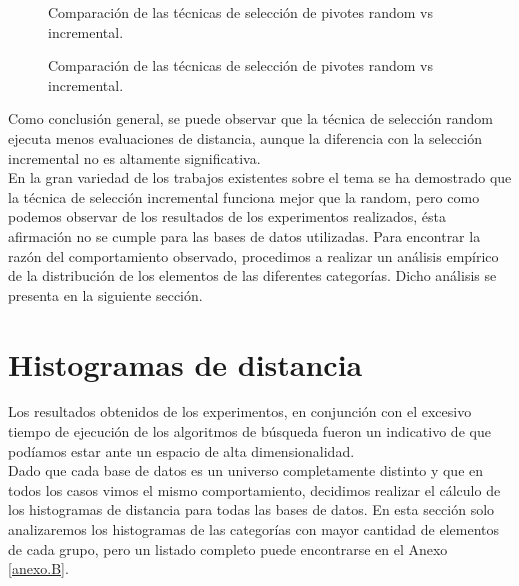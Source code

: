 \begin{figure}[tb]
\centering
{}
\caption{\small Comparaci\'on de las t\'ecnicas de selecci\'on de pivotes random vs incremental.}
\label{fig:ETS-1}
\end{figure}
\begin{figure}[tb]
\centering
{}
\caption{\small Comparaci\'on de las t\'ecnicas de selecci\'on de pivotes random vs incremental.}
\label{fig:ETS-2}

\end{figure}

Como conclusi\'on general, se puede observar que la t\'ecnica de selecci\'on random ejecuta menos evaluaciones de distancia, aunque la diferencia con la selecci\'on incremental no es altamente significativa.\\

En la gran variedad de los trabajos existentes sobre el tema se ha demostrado que la t\'ecnica de selecci\'on incremental funciona mejor que la random, pero como podemos observar de los resultados de los experimentos realizados, \'esta afirmaci\'on no se cumple para las bases de datos utilizadas. Para encontrar la raz\'on del comportamiento observado, procedimos a realizar un an\'alisis emp\'irico de la distribuci\'on de los elementos de las diferentes categor\'ias. Dicho an\'alisis se presenta en la siguiente secci\'on.


\section{Histogramas de distancia}
 
Los resultados obtenidos de los experimentos, en conjunci\'on con el excesivo tiempo de ejecuci\'on de los algoritmos de b\'usqueda fueron un indicativo de que pod\'iamos estar ante un espacio de alta dimensionalidad.\\

Dado que cada base de datos es un universo completamente distinto y que en todos los casos vimos el mismo comportamiento, decidimos realizar el c\'alculo de los histogramas de distancia para todas las bases de datos. En esta secci\'on solo analizaremos los histogramas de las categor\'ias con mayor cantidad de elementos de cada grupo, pero un listado completo puede encontrarse en el Anexo \ref{anexo.B}.\\\\

